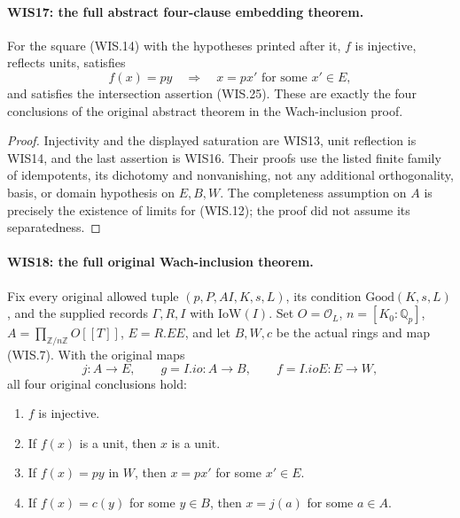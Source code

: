 \documentclass[11pt,a4paper]{article}
\numberwithin{equation}{section}
\theoremstyle{remark}\newtheorem{remark}[theorem]{Remark}
\begin{document}
\paragraph{WIS17: the full abstract four-clause embedding theorem.}
\label{claim:WIS17}
For the square (WIS.14) with the hypotheses printed after it,
$f$ is injective, reflects units, satisfies
\[
 f(x)=py\quad\Longrightarrow\quad x=px'
                                  \text{ for some }x'\in E,
\]
and satisfies the intersection assertion (WIS.25).
These are exactly the four conclusions of the original
abstract theorem in the Wach-inclusion proof.

\begin{proof}
Injectivity and the displayed saturation are WIS13,
unit reflection is WIS14, and the last assertion is WIS16.
Their proofs use the listed finite family of idempotents,
its dichotomy and nonvanishing, not any additional
orthogonality, basis, or domain hypothesis on $E,B,W$.
The completeness assumption on $A$ is precisely the
existence of limits for (WIS.12); the proof did not
assume its separatedness.
\end{proof}

\paragraph{WIS18: the full original Wach-inclusion theorem.}
\label{claim:WIS18}
Fix every original allowed tuple
$(p,P,AI,K,s,L)$, its condition $\mathrm{Good}(K,s,L)$,
and the supplied records $\Gamma,R,I$ with $\mathrm{IoW}(I)$.
Set $O=\mathcal O_L$, $n=[K_0:\mathbb Q_p]$,
$A=\prod_{\mathbb Z/n\mathbb Z}O[[T]]$, $E=R.EE$,
and let $B,W,c$ be the actual rings and map (WIS.7).
With the original maps
\[
 j:A\longrightarrow E,\qquad g=I.io:A\longrightarrow B,
                   \qquad f=I.ioE:E\longrightarrow W,
\]
all four original conclusions hold:
\begin{enumerate}
\item $f$ is injective.
\item If $f(x)$ is a unit, then $x$ is a unit.
\item If $f(x)=py$ in $W$, then $x=px'$ for some $x'\in E$.
\item If $f(x)=c(y)$ for some $y\in B$, then $x=j(a)$
      for some $a\in A$.
\end{enumerate}
\end{document}
